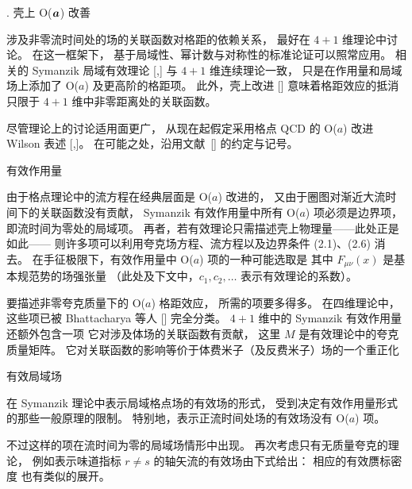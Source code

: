 
. 壳上 O($\boldsymbol a$) 改善

涉及非零流时间处的场的关联函数对格距的依赖关系，
最好在 $4+1$ 维理论中讨论。
在这一框架下，
基于局域性、幂计数与对称性的标准论证可以照常应用。
相关的 Symanzik 局域有效理论
[\cite{SymanzikSeffI},\cite{SymanzikSeffII}]
与 $4+1$ 维连续理论一致，
只是在作用量和局域场上添加了 O($a$) 及更高阶的格距项。
此外，壳上改进 [\cite{OnShell}]
意味着格距效应的抵消只限于
$4+1$ 维中非零距离处的关联函数。

尽管理论上的讨论适用面更广，
从现在起假定采用格点 QCD 的 O($a$) 改进 Wilson 表述
[\cite{SW},\cite{SFimp}]。
在可能之处，沿用文献~[\cite{SFimp}] 的约定与记号。


 有效作用量

由于格点理论中的流方程在经典层面是 O($a$) 改进的，
又由于圈图对渐近大流时间下的关联函数没有贡献，
Symanzik 有效作用量中所有 O($a$) 项必须是边界项，
即流时间为零处的局域项。
再者，若有效理论只需描述壳上物理量——此处正是如此——
则许多项可以利用夸克场方程、流方程以及边界条件 (2.1)、(2.6)
消去。
在手征极限下，有效作用量中 O($a$) 项的一种可能选取是
其中 $F_{\mu\nu}(x)$ 是基本规范势的场强张量
（此处及下文中，$c_1,c_2,\ldots$ 表示有效理论的系数）。

要描述非零夸克质量下的 O($a$) 格距效应，
所需的项要多得多。
在四维理论中，
这些项已被 Bhattacharya 等人 [\cite{ImpNonD}] 完全分类。
$4+1$ 维中的 Symanzik 有效作用量还额外包含一项
它对涉及体场的关联函数有贡献，
这里 $M$ 是有效理论中的夸克质量矩阵。
它对关联函数的影响等价于体费米子（及反费米子）场的一个重正化

 有效局域场

在 Symanzik 理论中表示局域格点场的有效场的形式，
受到决定有效作用量形式的那些一般原理的限制。
特别地，表示正流时间处场的有效场没有 O($a$) 项。

不过这样的项在流时间为零的局域场情形中出现。
再次考虑只有无质量夸克的理论，
例如表示味道指标 $r\neq s$ 的轴矢流的有效场由下式给出：
相应的有效赝标密度
也有类似的展开。

